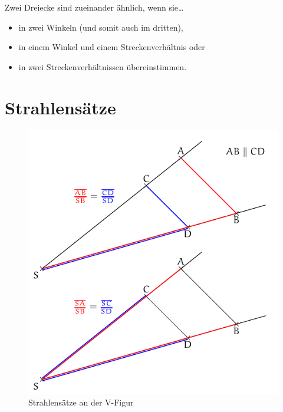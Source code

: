 \begin{regel}

Zwei Dreiecke sind zueinander ähnlich, wenn sie\ldots
\begin{itemize}
 \item in zwei Winkeln (und somit auch im dritten),
 \item in einem Winkel und einem Streckenverhältnis oder
 \item in zwei Streckenverhältnissen übereinstimmen.
\end{itemize}
\end{regel}

\section{Strahlensätze}

\begin{regel}

\begin{figure}[htp]
 \centering
 \includegraphics{./strahlensatz_v.pdf}
 \caption{Strahlensätze an der V-Figur}
 \label{fig:strahlensatz_v}
\end{figure}
 
 
\end{regel}

